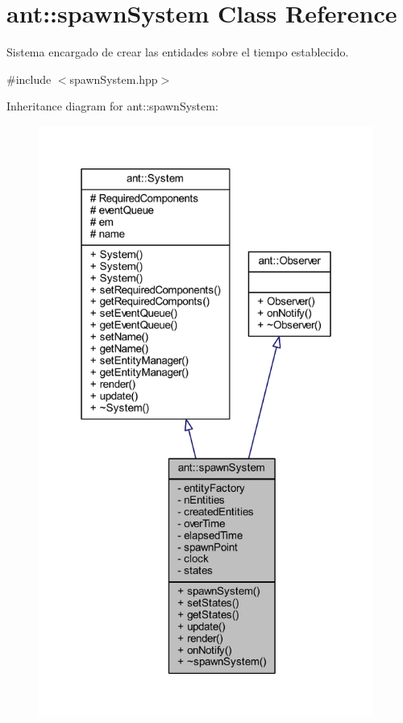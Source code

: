\hypertarget{classant_1_1spawn_system}{\section{ant\+:\+:spawn\+System Class Reference}
\label{classant_1_1spawn_system}
}


Sistema encargado de crear las entidades sobre el tiempo establecido.  




{\ttfamily \#include $<$spawn\+System.\+hpp$>$}



Inheritance diagram for ant\+:\+:spawn\+System\+:
\nopagebreak
\begin{figure}[H]
\begin{center}
\leavevmode
\includegraphics[height=550pt]{db/dea/classant_1_1spawn_system__inherit__graph}
\end{center}
\end{figure}


